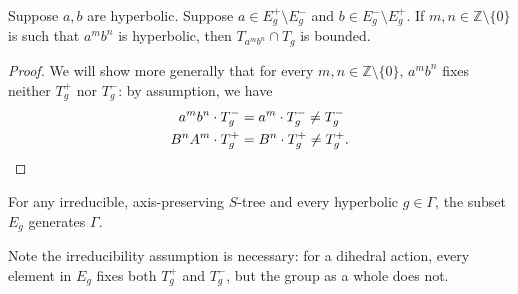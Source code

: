 \begin{lemma}
Suppose $a,b$ are hyperbolic.
Suppose $a \in E_g^+ \setminus E_g^-$ and $b \in E_g^- \setminus E_g^+$.
If $m, n \in \mathbb{Z} \setminus \{ 0\}$ is such that $a^m b^n$ is hyperbolic, then $T_{a^m b^n} \cap T_g$ is bounded.
\label{lem:force_bounded}
\end{lemma}
\begin{proof}

  We will show more generally that for every $m, n \in \mathbb{Z} \setminus \{ 0\}$, $a^m b^n$
  fixes neither $T^+_g$ nor $T^-_g$: by assumption, we have
  \begin{align*}
    a^m b^n \cdot T_g^- &= a^m \cdot T_g^- \ne T_g^-\\
    B^n A^m \cdot T_g^+ &= B^n \cdot T_g^+ \ne T_g^+. \qedhere
  \end{align*}
\end{proof}

\begin{lemma}\label{lem:Eg-generates}
  For any irreducible, axis-preserving $S$-tree and every hyperbolic
  $g \in \Gamma$, the subset $E_g$ generates $\Gamma$.
\end{lemma}

Note the irreducibility assumption is necessary: for a dihedral action, every element in $E_g$ fixes both $T_g^+$ and $T_g^-$, but the group as a whole does not.

